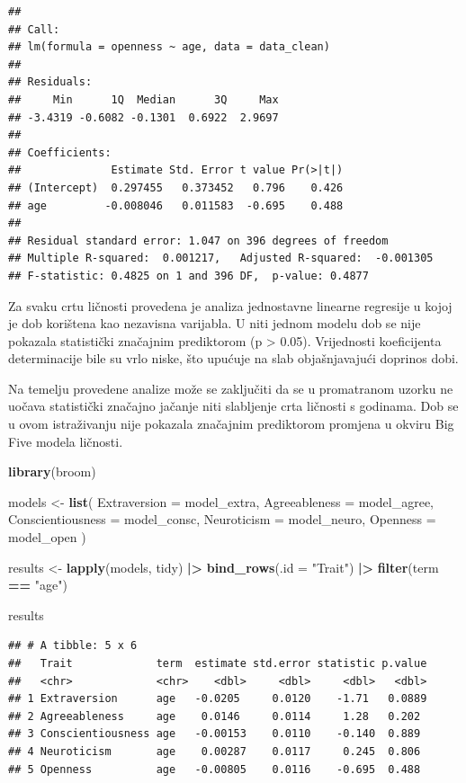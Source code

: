 \documentclass[
]{article}
\newenvironment{Shaded}{\begin{snugshade}}{\end{snugshade}}
\newcommand{\AttributeTok}[1]{\textcolor[rgb]{0.13,0.29,0.53}{#1}}
\newcommand{\FunctionTok}[1]{\textcolor[rgb]{0.13,0.29,0.53}{\textbf{#1}}}
\newcommand{\NormalTok}[1]{#1}
\newcommand{\OtherTok}[1]{\textcolor[rgb]{0.56,0.35,0.01}{#1}}
\newcommand{\SpecialCharTok}[1]{\textcolor[rgb]{0.81,0.36,0.00}{\textbf{#1}}}
\newcommand{\StringTok}[1]{\textcolor[rgb]{0.31,0.60,0.02}{#1}}
\begin{document}
\begin{verbatim}
## 
## Call:
## lm(formula = openness ~ age, data = data_clean)
## 
## Residuals:
##     Min      1Q  Median      3Q     Max 
## -3.4319 -0.6082 -0.1301  0.6922  2.9697 
## 
## Coefficients:
##              Estimate Std. Error t value Pr(>|t|)
## (Intercept)  0.297455   0.373452   0.796    0.426
## age         -0.008046   0.011583  -0.695    0.488
## 
## Residual standard error: 1.047 on 396 degrees of freedom
## Multiple R-squared:  0.001217,   Adjusted R-squared:  -0.001305 
## F-statistic: 0.4825 on 1 and 396 DF,  p-value: 0.4877
\end{verbatim}

Za svaku crtu ličnosti provedena je analiza jednostavne linearne
regresije u kojoj je dob korištena kao nezavisna varijabla. U niti
jednom modelu dob se nije pokazala statistički značajnim prediktorom (p
\textgreater{} 0.05). Vrijednosti koeficijenta determinacije bile su
vrlo niske, što upućuje na slab objašnjavajući doprinos dobi.

Na temelju provedene analize može se zaključiti da se u promatranom
uzorku ne uočava statistički značajno jačanje niti slabljenje crta
ličnosti s godinama. Dob se u ovom istraživanju nije pokazala značajnim
prediktorom promjena u okviru Big Five modela ličnosti.

\begin{Shaded}
\begin{Highlighting}[]
\FunctionTok{library}\NormalTok{(broom)}

\NormalTok{models }\OtherTok{\textless{}{-}} \FunctionTok{list}\NormalTok{(}
  \AttributeTok{Extraversion =}\NormalTok{ model\_extra,}
  \AttributeTok{Agreeableness =}\NormalTok{ model\_agree,}
  \AttributeTok{Conscientiousness =}\NormalTok{ model\_consc,}
  \AttributeTok{Neuroticism =}\NormalTok{ model\_neuro,}
  \AttributeTok{Openness =}\NormalTok{ model\_open}
\NormalTok{)}

\NormalTok{results }\OtherTok{\textless{}{-}} \FunctionTok{lapply}\NormalTok{(models, tidy) }\SpecialCharTok{|\textgreater{}} 
  \FunctionTok{bind\_rows}\NormalTok{(}\AttributeTok{.id =} \StringTok{"Trait"}\NormalTok{) }\SpecialCharTok{|\textgreater{}} 
  \FunctionTok{filter}\NormalTok{(term }\SpecialCharTok{==} \StringTok{"age"}\NormalTok{)}

\NormalTok{results}
\end{Highlighting}
\end{Shaded}

\begin{verbatim}
## # A tibble: 5 x 6
##   Trait             term  estimate std.error statistic p.value
##   <chr>             <chr>    <dbl>     <dbl>     <dbl>   <dbl>
## 1 Extraversion      age   -0.0205     0.0120    -1.71   0.0889
## 2 Agreeableness     age    0.0146     0.0114     1.28   0.202 
## 3 Conscientiousness age   -0.00153    0.0110    -0.140  0.889 
## 4 Neuroticism       age    0.00287    0.0117     0.245  0.806 
## 5 Openness          age   -0.00805    0.0116    -0.695  0.488
\end{verbatim}
\end{document}
